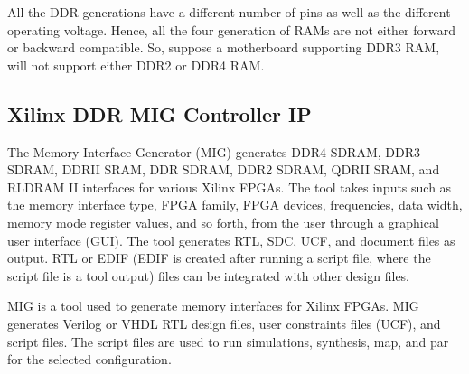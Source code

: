 \par All the DDR generations have a different number of pins as well as the different operating voltage. Hence, all the four generation of RAMs are not either forward or backward compatible. So, suppose a motherboard supporting DDR3 RAM, will not support either DDR2 or DDR4 RAM.

\subsection{Xilinx DDR MIG Controller IP}

The Memory Interface Generator (MIG) generates DDR4 SDRAM, DDR3 SDRAM, DDRII SRAM, DDR SDRAM, DDR2 SDRAM, QDRII SRAM, and RLDRAM II interfaces for various Xilinx FPGAs. The tool takes inputs such as the memory interface type, FPGA family, FPGA devices, frequencies, data width, memory mode register values, and so forth, from the user through a graphical user interface (GUI). The
tool generates RTL, SDC, UCF, and document files as output. RTL or EDIF (EDIF is created after running a script file, where the script file is a tool output) files can be integrated with other design files.

MIG is a tool used to generate memory interfaces for Xilinx FPGAs. MIG generates Verilog or VHDL RTL design files, user constraints files (UCF), and script files. The script files are used to run simulations, synthesis, map, and par for the selected configuration.